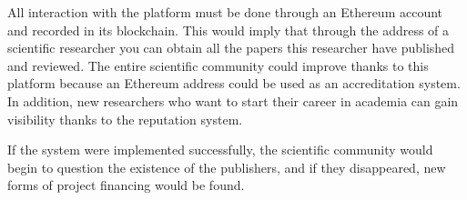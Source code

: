 All interaction with the platform must be done through an Ethereum account and recorded in its blockchain. This would imply that through the address of a scientific researcher you can obtain all the papers this researcher have published and reviewed. The entire scientific community could improve thanks to this platform because an Ethereum address could be used as an accreditation system. In addition, new researchers who want to start their career in academia can gain visibility thanks to the reputation system.

If the system were implemented successfully, the scientific community would begin to question the existence of the publishers, and if they disappeared, new forms of project financing would be found.




